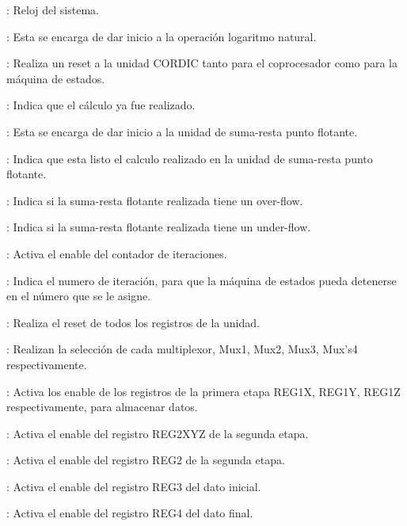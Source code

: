 \begin{compactitem}
\item {}: Reloj del sistema. 

\item {}: Esta se encarga de dar inicio a la operación logaritmo natural. 

\item {}: Realiza un reset a la unidad CORDIC tanto para el coprocesador como para la máquina de estados.
 

\item {}: Indica que el cálculo ya fue realizado.

\item {}: Esta se encarga de dar inicio a la unidad de suma-resta punto flotante.

\item {}: Indica que esta listo el calculo realizado en la unidad de suma-resta punto flotante.

\item {}: Indica si la suma-resta flotante realizada tiene un over-flow.

\item {}: Indica si la suma-resta flotante realizada tiene un under-flow.

\item {}: Activa el enable del contador de iteraciones. 

\item {}: Indica el numero de iteración, para que la máquina de estados pueda detenerse en el número que se le asigne.
 
\item {}: Realiza el reset de todos los registros de la unidad.

\item {}: Realizan la selección de cada multiplexor, Mux1, Mux2, Mux3, Mux's4 respectivamente.

\item {}: Activa los enable de los registros de la primera etapa REG1X, REG1Y, REG1Z respectivamente, para almacenar datos. 

\item {}: Activa el enable del registro REG2XYZ de la segunda etapa. 

\item {}: Activa el enable del registro REG2 de la segunda etapa.

\item {}: Activa el enable del registro REG3 del dato inicial.

\item {}: Activa el enable del registro REG4 del dato final. 

\end{compactitem}

